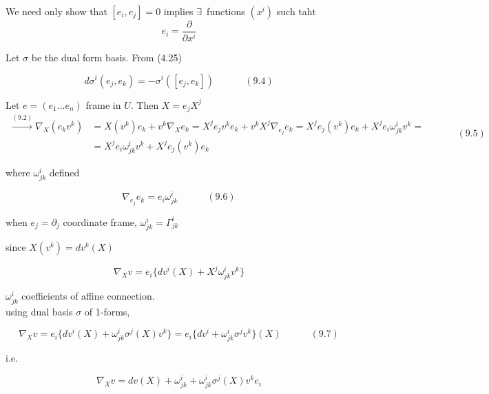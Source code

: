 We need only show that $[e_i, e_j]=0$ implies $\exists \, $ functions $(x^i)$ such taht 
\[
e_i = \frac{ \partial }{ \partial x^i }
\]

Let $\sigma$ be the dual form basis.  From (4.25)

\begin{equation}
d\sigma^i(e_j, e_k) = -\sigma^i([e_j, e_k]) \quad \quad \quad \, (9.4)        
\end{equation}








Let $e = (e_1 \dots e_n)$ frame in $U$.  Then $X=e_j X^j$ 
\begin{equation}
\begin{aligned}
        \xrightarrow{ (9.2)} \nabla_X(e_k v^k) & = X(v^k) e_k + v^k \nabla_X e_k = X^j e_j v^k e_k + v^k X^j \nabla_{e_j} e_k = X^j e_j(v^k)e_k + X^j e_i \omega^i_{jk} v^k = \\ 
        & = X^j e_i \omega^i_{jk} v^k + X^j e_j(v^k)e_k 
\end{aligned} \quad \quad \quad (9.5)
\end{equation}

where $\omega^i_{jk}$ defined 

\begin{equation}
        \nabla_{e_j} e_k = e_i \omega^i_{jk} \quad \quad \quad (9.6)
\end{equation}

when $e_j = \partial_j$ coordinate frame, $\omega^i_{jk} = \Gamma^i_{jk}$

since $X(v^k) = dv^k(X)$

\[
\nabla_X v = e_i \lbrace dv^i(X) + X^j\omega^i_{jk} v^k \rbrace
\]

$\omega^i_{jk}$ coefficients of affine connection.  \\

using dual basis $\sigma$ of 1-forms,

\begin{equation}
        \nabla_X v = e_i \lbrace dv^i(X) + \omega^i_{jk} \sigma^j(X) v^k \rbrace = e_i \lbrace dv^i + \omega^i_{jk} \sigma^j v^k \rbrace(X) \quad \quad \quad (9.7)
\end{equation}

i.e.

\begin{equation}
\boxed{ \nabla_X v = dv(X) + \omega^i_{jk} + \omega^i_{jk} \sigma^j(X) v^ke_i }
\end{equation}


